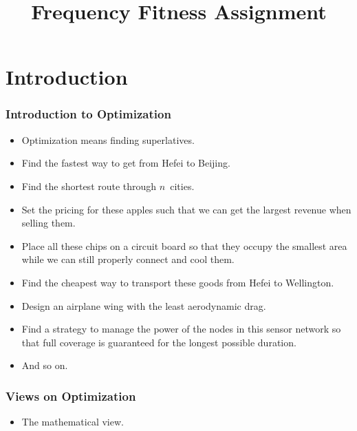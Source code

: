 \documentclass[aspectratio=169,mathserif,notheorems]{beamer}%
\title{Frequency Fitness Assignment}%
\begin{document}
%
\startPresentation%
%
\section{Introduction}%
%
\begin{frame}[t]%
\frametitle{Introduction to Optimization}%
\begin{itemize}%
\item Optimization means finding superlatives.%
\item<2-> Find the \alert{fastest} way to get from Hefei to Beijing.%
\item<3-> Find the \alert{shortest} route through $n$~cities.%
\item<4-> Set the pricing for these apples such that we can get the \alert{largest} revenue when selling them.%
\item<5-> Place all these chips on a circuit board so that they occupy the \alert{smallest} area while we can still properly connect and cool them.%
\item<6-> Find the \alert{cheapest} way to transport these goods from Hefei to Wellington.%
\item<7-> Design an airplane wing with the \alert{least} aerodynamic drag.%
\item<8-> Find a strategy to manage the power of the nodes in this sensor network so that full coverage is guaranteed for the \alert{longest} possible duration.%
\item<9-> And so on.%
\end{itemize}%
%
%
\end{frame}%
%
\begin{frame}[t]%
\frametitle{Views on Optimization}%
\begin{itemize}%
%
%
\item<3-> The mathematical view.%
\end{itemize}%
%
%
\end{frame}%
\end{document}
